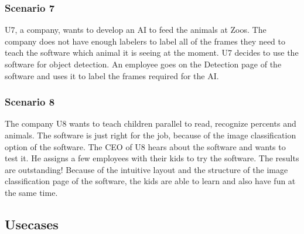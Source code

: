 \documentclass[parskip=full]{scrartcl}
\begin{document}
\subsubsection{Scenario 7}
U7, a company, wants to develop an AI to feed the animals at Zoos. The company does not have enough labelers to label all of the frames they need to teach the software which animal it is seeing at the moment. U7 decides to use the software for object detection. An employee goes on the Detection page of the software and uses it to label the frames required for the AI.
\subsubsection{Scenario 8}
The company U8 wants to teach children parallel to read, recognize percents and animals. The software is just right for the job, because of the \gls{image classification} option of the software. The CEO of U8 hears about the software and wants to test it. He assigns a few employees with their kids to try the software. The results are outstanding! Because of the intuitive layout and the structure of the \gls{image classification} page of the software, the kids are able to learn and also have fun at the same time.
\clearpage
\subsection{Usecases}
\end{document}
